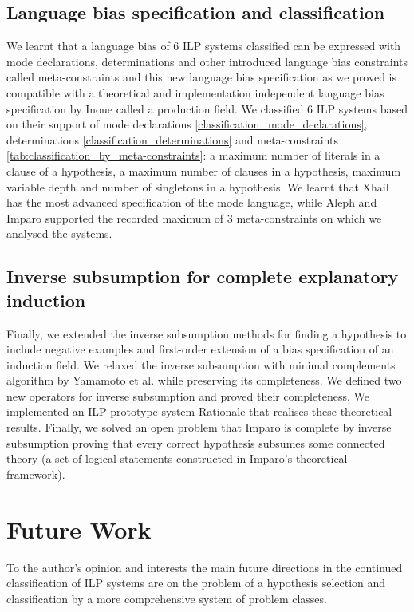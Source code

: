 \subsection{Language bias specification and classification}
We learnt that a language bias of 6 ILP systems classified can be expressed with mode declarations, determinations and other introduced language bias constraints called meta-constraints and this new language bias specification as we proved is compatible with a theoretical and implementation independent language bias specification by Inoue called a production field. We classified 6 ILP systems based on their support of mode declarations \ref{classification_mode_declarations},
determinations \ref{classification_determinations} and meta-constraints \ref{tab:classification_by_meta-constraints}: a maximum number of literals in a clause of a hypothesis, a maximum number of clauses in a hypothesis, maximum variable depth and number of singletons in a hypothesis. We learnt that Xhail has the most advanced specification of the mode language, while Aleph and Imparo supported the recorded maximum of 3 meta-constraints on which we analysed the systems.

\subsection{Inverse subsumption for complete explanatory induction}
Finally, we extended the inverse subsumption methods for finding a hypothesis to include negative examples and first-order extension of a bias specification of an induction field. We relaxed the inverse subsumption with minimal complements algorithm by Yamamoto et al. while preserving its completeness. We defined two new  operators for inverse subsumption and proved their completeness. We implemented an ILP prototype system Rationale that realises these theoretical results. Finally, we solved an open problem that Imparo
is complete by inverse subsumption proving that every correct hypothesis subsumes some connected
theory (a set of logical statements constructed in Imparo's theoretical framework).

\section{Future Work}
To the author's opinion and interests the main future directions in the continued classification of ILP systems are on the problem of a hypothesis selection and classification by a more comprehensive system of problem classes.

